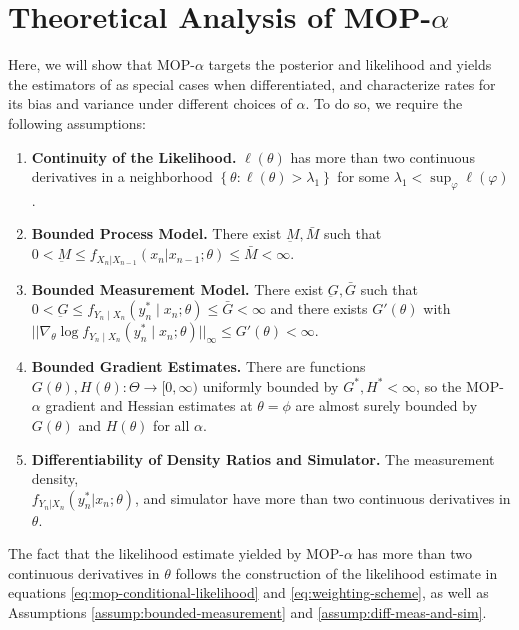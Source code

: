 \documentclass[11pt]{article}
\newcommand\arxiv[2]{#1} %
\begin{document}

\section{Theoretical Analysis of MOP-$\alpha$}
\label{sec:thms}

Here, we will show that MOP-$\alpha$ targets the posterior and likelihood and yields the estimators of \cite{poyiadjis11, scibior21, naesseth18} as special cases when differentiated, and characterize rates for its bias and variance under different choices of $\alpha$. To do so, we require the following assumptions:

\begin{enumerate}[label=(A\arabic*),itemsep=-1.2ex] 
    \item \textbf{Continuity of the Likelihood.} $\ell(\theta)$ has more than two continuous derivatives in a neighborhood $\left\{\theta: \ell(\theta)>\lambda_1\right\}$ for some $\lambda_1<\sup _{\varphi} \ell(\varphi)$. \label{assump:conti-lik}
    \item \textbf{Bounded Process Model.} There exist $\underbar{M}, \bar{M}$ such that $0 < \underbar{M} \leq f_{X_n|X_{n-1}}(x_n | x_{n-1};\theta) \leq \bar{M} < \infty$. \label{assump:bounded-process}
    \item \textbf{Bounded Measurement Model.} There exist $\underbar{G}, \bar{G}$ such that $0<\underbar{G} \leq f_{Y_n \mid X_n}\left(y_n^* \mid x_n; \theta\right) \leq \bar{G}<\infty$ and there exists $G'(\theta)$ with $||\nabla_\theta \log f_{Y_n \mid X_n}\left(y_n^* \mid x_n; \theta\right)||_\infty \leq G'(\theta)< \infty$. \label{assump:bounded-measurement}
    \item \textbf{Bounded Gradient Estimates.} There are functions $G(\theta), H(\theta): \Theta \to [0,\infty)$ uniformly bounded by $G^*, H^*<\infty$, so the MOP-$\alpha$ gradient and Hessian estimates at $\theta=\phi$ are almost surely bounded by $G(\theta)$ and $H(\theta)$ for all $\alpha$. \label{assump:local-bounded-derivative}
    \item \textbf{Differentiability of Density Ratios and Simulator.} The measurement density, \arxiv{\\}{}$f_{Y_n|X_n}(y_n^*|x_n; \theta)$, and simulator have more than two continuous derivatives in $\theta$. \label{assump:diff-meas-and-sim}
\end{enumerate}

The fact that the likelihood estimate yielded by MOP-$\alpha$ has more than two continuous derivatives in $\theta$ follows the construction of the likelihood estimate in equations \ref{eq:mop-conditional-likelihood} and \ref{eq:weighting-scheme}, as well as Assumptions \ref{assump:bounded-measurement} and \ref{assump:diff-meas-and-sim}. 
\end{document}
